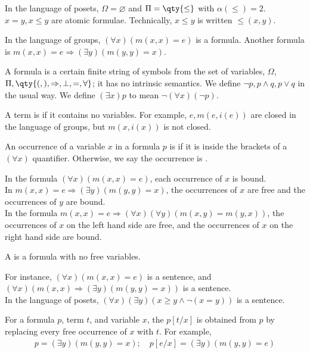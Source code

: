 \begin{example}
    In the language of posets, $\Omega = \varnothing$ and $\Pi = \qty{\leq}$ with $\alpha(\leq) = 2$.
    $x = y, x \leq y$ are atomic formulae.
    Technically, $x \leq y$ is written $\leq(x, y)$.
\end{example}

\begin{example}
    In the language of groups, $(\forall x) (m(x,x) = e)$ is a formula.
    Another formula is $m(x,x) = e \Rightarrow (\exists y) (m(y,y) = x)$.
\end{example}

\begin{remark}
    A formula is a certain finite string of symbols from the set of variables, $\Omega$, $\Pi, \qty{(, ), \implies, \bot, =, \forall}$; it has no intrinsic semantics.
    We define $\neg p, p \wedge q, p \vee q$ in the usual way.
    We define $(\exists x) p$ to mean $\neg(\forall x) (\neg p)$.
\end{remark}

A term is  if it contains no variables.
For example, $e, m(e,i(e))$ are closed in the language of groups, but $m(x,i(x))$ is not closed.

An occurrence of a variable $x$ in a formula $p$ is  if it is inside the brackets of a $(\forall x)$ quantifier.
Otherwise, we say the occurrence is .
\begin{example}
    In the formula $(\forall x)(m(x,x) = e)$, each occurrence of $x$ is bound. \\
    In $m(x,x) = e \Rightarrow (\exists y)(m(y,y) = x)$, the occurrences of $x$ are free and the occurrences of $y$ are bound. \\
    In the formula $m(x,x) = e \Rightarrow (\forall x)(\forall y)(m(x,y) = m(y,x))$, the occurrences of $x$ on the left hand side are free, and the occurrences of $x$ on the right hand side are bound.
\end{example}

A  is a formula with no free variables.
\begin{example}
    For instance, $(\forall x)(m(x,x) = e)$ is a sentence, and $(\forall x)(m(x,x) \Rightarrow (\exists y)(m(y,y) = x))$ is a sentence. \\
    In the language of posets, $(\forall x)(\exists y)(x \geq y \wedge \neg(x = y))$ is a sentence.
\end{example}

For a formula $p$, term $t$, and variable $x$, the  $p[t/x]$ is obtained from $p$ by replacing every free occurrence of $x$ with $t$.
For example,
\begin{align*}
    p = (\exists y)(m(y,y) = x);\quad p[e/x] = (\exists y)(m(y,y) = e)
\end{align*}

